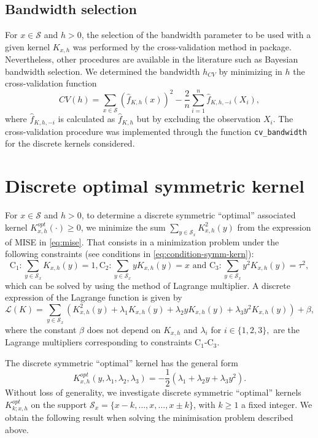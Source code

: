 \subsection{Bandwidth selection}\label{bandwidth-selection}

For \(x\in \mathcal{S}\) and \(h>0\), the selection of the bandwidth parameter to be used with a given kernel \(K_{x,h}\) was performed by the cross-validation method in  package. Nevertheless, other procedures are available in the literature such as Bayesian bandwidth selection. We determined the bandwidth \(h_{CV}\) by minimizing in \(h\) the cross-validation function
\begin{equation*}
   CV(h)= \sum_{x\in\mathcal{S}}\left (\widehat{f}_{K,h}(x)\right )^{2} -\frac{2}{n}\sum_{i=1}^{n}\widehat{f}_{K,h,-i}(X_{i}),
\end{equation*}
where \(\widehat{f}_{K,h,-i}\) is calculated as \(\widehat{f}_{K,h}\) but by excluding the observation \(X_{i}\). The cross-validation procedure was implemented through the function \texttt{cv\_bandwidth} for the discrete kernels considered.

\section{Discrete optimal symmetric kernel}\label{sec3-optimal-kernel}

For \(x \in \mathcal{S}\) and \(h>0\), to determine a discrete symmetric ``optimal'' associated kernel \(K_{x,h}^{opt}(\cdot)\geq0\), we minimize the sum \(\sum_{y\in\mathcal{S}_{x}}K^{2}_{x,h}(y)\) from the expression of MISE in \eqref{eq:mise}. That consists in a minimization problem under the following constraints (see conditions in \eqref{eq:condition-symm-kern}):
\[\text{C}_{1}:\sum_{y\in\mathcal{S}_{x}}K_{x,h}(y)=1,  \text{C}_{2}:\sum_{y\in\mathcal{S}_{x}}yK_{x,h}(y)=x \text{\ and \ }\text{C}_{3}:\sum_{y\in\mathcal{S}_{x}}y^{2}K_{x,h}(y)=\tau^{2}, \]
which can be solved by using the method of Lagrange multiplier. A discrete expression of the Lagrange function is given by
\[\mathcal{L}(K)= \sum_{y\in\mathcal{S}_{x}}\left (K_{x,h}^{2}(y) + \lambda_{1} K_{x,h}(y)+ \lambda_{2}yK_{x,h}(y)+ \lambda_{3}y^{2}K_{x,h}(y)\right )+ \beta,\]
where the constant \(\beta\) does not depend on \(K_{x,h}\) and \(\lambda_{i}\) for \(i\in \{1,2,3\},\) are the Lagrange multipliers corresponding to constraints C\(_1\)-C\(_3\).

The discrete symmetric ``optimal'' kernel has the general form
\begin{equation*}\label{eq:Kh_opt}
K_{x,h}^{opt}(y,\lambda_{1},\lambda_{2},\lambda_{3})=-\frac{1}{2}(\lambda_{1} +\lambda_{2}y+\lambda_{3}y^{2}).  
\end{equation*}
Without loss of generality, we investigate discrete symmetric ``optimal'' kernels \(K_{k;x,h}^{opt}\) on the support \(\mathcal{S}_{x}=\{x-k,\ldots,x,\ldots,x\pm k\}\), with \(k\geq1\) a fixed integer. We obtain the following result when solving the minimisation problem described above.

